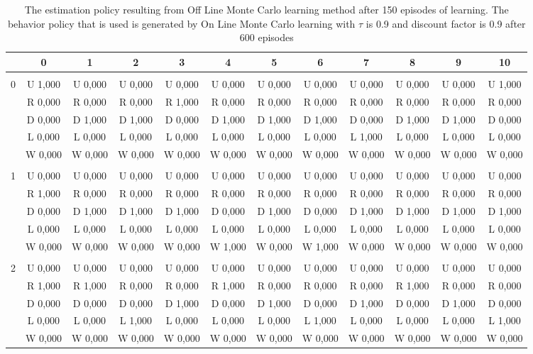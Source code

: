 \documentclass{article}
\begin{document}
 \begin{table}[htbp]
\caption{The estimation policy resulting from Off Line Monte Carlo learning method after 150 episodes of learning. The behavior policy that is used is generated by On Line Monte Carlo learning with $\tau$ is 0.9 and discount factor is 0.9 after 600 episodes}
\label{policyOffline}
\centering
\begin{footnotesize}
\begin{tabular}{c|c|c|c|c|c|c|c|c|c|c|c|}
&0&1&2&3&4&5&6&7&8&9&10\\ \hline\\
0&U 1,000&U 0,000&U 0,000&U 0,000&U 0,000&U 0,000&U 0,000&U 0,000&U 0,000&U 0,000&U 1,000\\
&R 0,000&R 0,000&R 0,000&R 1,000&R 0,000&R 0,000&R 0,000&R 0,000&R 0,000&R 0,000&R 0,000\\
&D 0,000&D 1,000&D 1,000&D 0,000&D 1,000&D 1,000&D 1,000&D 0,000&D 1,000&D 1,000&D 0,000\\
&L 0,000&L 0,000&L 0,000&L 0,000&L 0,000&L 0,000&L 0,000&L 1,000&L 0,000&L 0,000&L 0,000\\
&W 0,000&W 0,000&W 0,000&W 0,000&W 0,000&W 0,000&W 0,000&W 0,000&W 0,000&W 0,000&W 0,000\\
\hline \\
1&U 0,000&U 0,000&U 0,000&U 0,000&U 0,000&U 0,000&U 0,000&U 0,000&U 0,000&U 0,000&U 0,000\\
&R 1,000&R 0,000&R 0,000&R 0,000&R 0,000&R 0,000&R 0,000&R 0,000&R 0,000&R 0,000&R 0,000\\
&D 0,000&D 1,000&D 1,000&D 1,000&D 0,000&D 1,000&D 0,000&D 1,000&D 1,000&D 1,000&D 1,000\\
&L 0,000&L 0,000&L 0,000&L 0,000&L 0,000&L 0,000&L 0,000&L 0,000&L 0,000&L 0,000&L 0,000\\
&W 0,000&W 0,000&W 0,000&W 0,000&W 1,000&W 0,000&W 1,000&W 0,000&W 0,000&W 0,000&W 0,000\\
\hline \\
2&U 0,000&U 0,000&U 0,000&U 0,000&U 0,000&U 0,000&U 0,000&U 0,000&U 0,000&U 0,000&U 0,000\\
&R 1,000&R 1,000&R 0,000&R 0,000&R 1,000&R 0,000&R 0,000&R 0,000&R 1,000&R 0,000&R 0,000\\
&D 0,000&D 0,000&D 0,000&D 1,000&D 0,000&D 1,000&D 0,000&D 1,000&D 0,000&D 1,000&D 0,000\\
&L 0,000&L 0,000&L 1,000&L 0,000&L 0,000&L 0,000&L 1,000&L 0,000&L 0,000&L 0,000&L 1,000\\
&W 0,000&W 0,000&W 0,000&W 0,000&W 0,000&W 0,000&W 0,000&W 0,000&W 0,000&W 0,000&W 0,000\\

\end{tabular}
\end{footnotesize}
\end{table}
\end{document}
